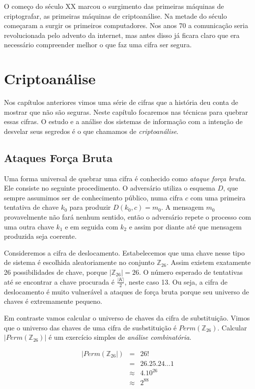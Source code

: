 O começo do século XX marcou o surgimento das primeiras máquinas de criptografar, as primeiras máquinas de criptoanálise.
Na metade do século começaram a surgir os primeiros computadores.
Nos anos 70 a comunicação seria revolucionada pelo advento da internet, mas antes disso já ficara claro que era necessário compreender melhor o que faz uma cifra ser segura.


\section{Criptoanálise}
\label{sec:criptoanalise}

Nos capítulos anteriores vimos uma série de cifras que a história deu conta de mostrar que não são seguras.
Neste capítulo focaremos nas técnicas para quebrar essas cifras.
O estudo e a análise dos sistemas de informação com a intenção de desvelar seus segredos é o que chamamos de {\em criptoanálise}.

\subsection{Ataques Força Bruta}
\label{sec:forca-bruta}

Uma forma universal de quebrar uma cifra é conhecido como {\em ataque força bruta}.
Ele consiste no seguinte procedimento.
O adversário utiliza o esquema $D$, que sempre assumimos ser de conhecimento público, numa cifra $c$ com uma primeira tentativa de chave $k_0$ para produzir $D(k_0, c) = m_0$.
A mensagem $m_0$ provavelmente não fará nenhum sentido, então o adversário repete o processo com uma outra chave $k_1$ e em seguida com $k_2$ e assim por diante até que mensagem produzida seja coerente.

Consideremos a cifra de deslocamento.
Estabelecemos que uma chave nesse tipo de sistema é escolhida aleatoriamente no conjunto $\mathbb{Z}_{26}$.
Assim existem exatamente 26 possibilidades de chave, porque $|\mathbb{Z}_{26}| = 26$.
O número esperado de tentativas até se encontrar a chave procurada é $\frac{|K|}{2}$, neste caso 13.
Ou seja, a cifra de deslocamento é muito vulnerável a ataques de força bruta porque seu universo de chaves é extremamente pequeno.

Em contraste vamos calcular o universo de chaves da cifra de substituição.
Vimos que o universo das chaves de uma cifra de susbstituição é $Perm(\mathbb{Z}_{26})$.
Calcular $|Perm(\mathbb{Z}_{26})|$ é um exercício simples de {\em análise combinatória}.

\begin{eqnarray*}
  |Perm(\mathbb{Z}_{26}|) & = & 26!\\
                         & = & 26.25.24 \dots 1\\
                         & \approx & 4.10^{26}\\
                         & \approx & 2^{88}
\end{eqnarray*}

